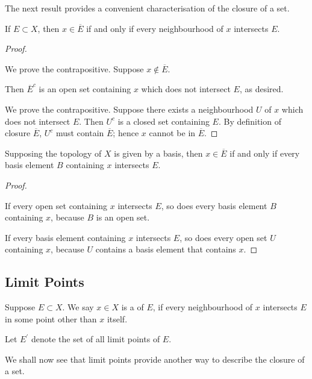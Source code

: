 The next result provides a convenient characterisation of the closure of a set.

\begin{lemma}\label{lemma:closure-characterisation}
If $E\subset X$, then $x\in\overline{E}$ if and only if every neighbourhood of $x$ intersects $E$.
\end{lemma}

\begin{proof} \

\forward We prove the contrapositive. Suppose $x\notin\overline{E}$.

Then $\overline{E}^c$ is an open set containing $x$ which does not intersect $E$, as desired.

\backward We prove the contrapositive. Suppose there exists a neighbourhood $U$ of $x$ which does not intersect $E$. 
Then $U^c$ is a closed set containing $E$. By definition of closure $\overline{E}$, $U^c$ must contain $\overline{E}$; hence $x$ cannot be in $\overline{E}$.
\end{proof}

\begin{corollary}
Supposing the topology of $X$ is given by a basis, then $x\in\overline{E}$ if and only if every basis element $B$ containing $x$ intersects $E$.
\end{corollary}

\begin{proof} \

\forward If every open set containing $x$ intersects $E$, so does every basis element $B$ containing $x$, because $B$ is an open set. 

\backward If every basis element containing $x$ intersects $E$, so does every open set $U$ containing $x$, because $U$ contains a basis element that contains $x$.
\end{proof}
\pagebreak

\subsection{Limit Points}
\begin{definition}
Suppose $E\subset X$. We say $x\in X$ is a  of $E$, if every neighbourhood of $x$ intersects $E$ in some point other than $x$ itself.
\end{definition}

Let $E^\prime$ denote the set of all limit points of $E$.

We shall now see that limit points provide another way to describe the closure of a set.

